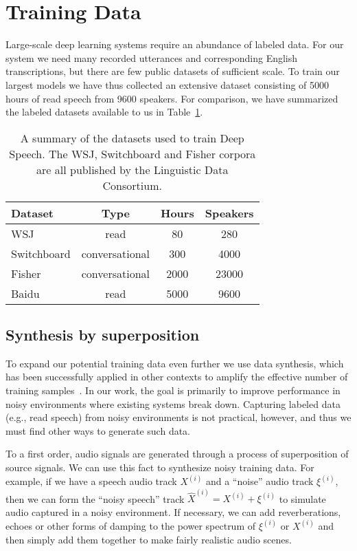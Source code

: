 \section{Training Data}
\label{sec:deepspeech:data}

Large-scale deep learning systems require an abundance of labeled data. For our
system we need many recorded utterances and corresponding English
transcriptions, but there are few public datasets of sufficient scale. To train
our largest models we have thus collected an extensive dataset consisting of
5000 hours of read speech from 9600 speakers. For comparison, we have
summarized the labeled datasets available to us in
Table~\ref{table:deepspeech:datasets}.

\begin{table}[]
\centering
\begin{tabular}{l c c c}
 \toprule
 Dataset & Type & Hours & Speakers  \\
 \midrule
 WSJ         & read           &   80 & 280 \\
 Switchboard & conversational &  300 & 4000 \\
 Fisher      & conversational & 2000 & 23000 \\
 Baidu       & read           & 5000 & 9600 \\
 \bottomrule
\end{tabular}
\caption{A summary of the datasets used to train Deep Speech. The WSJ,
    Switchboard and Fisher corpora are all published by the Linguistic Data
    Consortium.}
\label{table:deepspeech:datasets}
\end{table}

\subsection{Synthesis by superposition}
\label{sec:deepspeech:noisesynth}

To expand our potential training data even further we use data synthesis, which
has been successfully applied in other contexts to amplify the effective number
of training samples~\cite{sapp2008, lecun2004, coates2011}. In our work, the
goal is primarily to improve performance in noisy environments where existing
systems break down. Capturing labeled data (e.g., read speech) from noisy
environments is not practical, however, and thus we must find other ways to
generate such data.

To a first order, audio signals are generated through a process of
superposition of source signals. We can use this fact to synthesize noisy
training data. For example, if we have a speech audio track $X^{(i)}$ and a
``noise'' audio track $\xi^{(i)}$, then we can form the ``noisy speech'' track
$\hat{X}^{(i)} = X^{(i)}+\xi^{(i)}$ to simulate audio captured in a noisy
environment. If necessary, we can add reverberations, echoes or other forms of
damping to the power spectrum of $\xi^{(i)}$ or $X^{(i)}$ and then simply add
them together to make fairly realistic audio scenes.

